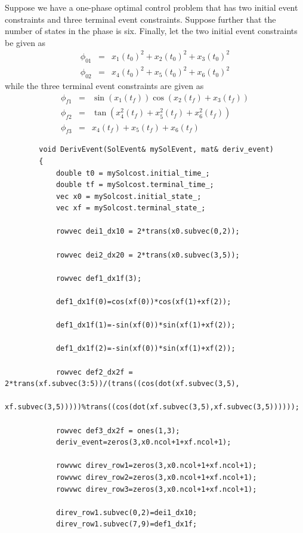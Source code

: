 \documentclass[10pt]{article}
\begin{document}
\begin{itemize}
\begin{frame}
		{\noindent}Suppose we have a one-phase optimal control problem that has two
		initial event constraints and three terminal event constraints.  Suppose
		further that the number of states in the phase is six.
		Finally, let the two initial event constraints be given as
		\begin{displaymath}
		\begin{array}{lcl}
		\phi_{01} & = & x_1(t_0)^2+x_2(t_0)^2+x_3(t_0)^2 \\
		\phi_{02} & = & x_4(t_0)^2+x_5(t_0)^2+x_6(t_0)^2
		\end{array}
		\end{displaymath}
		while the three terminal event constraints are given as
		\begin{displaymath}
		\begin{array}{lcl}
		\phi_{f1} & = & \sin(x_1(t_f))\cos(x_2(t_f)+x_3(t_f)) \\
		\phi_{f2} & = & \tan(x_4^2(t_f)+x_5^2(t_f)+x_6^2(t_f)) \\
		\phi_{f3} & = & x_4(t_f)+x_5(t_f)+x_6(t_f)
		\end{array}
		\end{displaymath}
		\begin{lstlisting}
		void DerivEvent(SolEvent& mySolEvent, mat& deriv_event)
		{
			double t0 = mySolcost.initial_time_;
			double tf = mySolcost.terminal_time_;
			vec x0 = mySolcost.initial_state_;
			vec xf = mySolcost.terminal_state_;
			
			rowvec dei1_dx10 = 2*trans(x0.subvec(0,2));
			
			rowvec dei2_dx20 = 2*trans(x0.subvec(3,5));

			rowvec def1_dx1f(3);
			
			def1_dx1f(0)=cos(xf(0))*cos(xf(1)+xf(2));
			
			def1_dx1f(1)=-sin(xf(0))*sin(xf(1)+xf(2));
			
			def1_dx1f(2)=-sin(xf(0))*sin(xf(1)+xf(2));
			
			rowvec def2_dx2f =  2*trans(xf.subvec(3:5))/(trans((cos(dot(xf.subvec(3,5),
			xf.subvec(3,5)))))%trans((cos(dot(xf.subvec(3,5),xf.subvec(3,5))))));
			
			rowvec def3_dx2f = ones(1,3);
			deriv_event=zeros(3,x0.ncol+1+xf.ncol+1);
			
			rowvwc direv_row1=zeros(3,x0.ncol+1+xf.ncol+1);
			rowvwc direv_row2=zeros(3,x0.ncol+1+xf.ncol+1);
			rowvwc direv_row3=zeros(3,x0.ncol+1+xf.ncol+1);
			
			direv_row1.subvec(0,2)=dei1_dx10;
			direv_row1.subvec(7,9)=def1_dx1f;
			

\end{lstlisting}
\end{frame}
\end{itemize}
\end{document}
